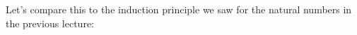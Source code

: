 \documentclass{lecturenotes}
\begin{document}
\begin{center}
    \begin{code}%
%
\>[8]\AgdaSpace{}%
\AgdaSymbol{:}\AgdaSpace{}%
\AgdaSpace{}%
\AgdaSymbol{(}\AgdaSpace{}%
\AgdaSymbol{:}\AgdaSpace{}%
\AgdaSpace{}%
\AgdaSymbol{->}\AgdaSpace{}%
\AgdaSymbol{)}\AgdaSpace{}%
\AgdaSymbol{->}\AgdaSpace{}%
\AgdaSpace{}%
\AgdaSpace{}%
\AgdaSymbol{->}\AgdaSpace{}%
\AgdaSpace{}%
\AgdaSpace{}%
\AgdaSymbol{->}\AgdaSpace{}%
\AgdaSpace{}%
\AgdaSymbol{(}\AgdaSpace{}%
\AgdaSymbol{:}\AgdaSpace{}%
\AgdaSymbol{)}\AgdaSpace{}%
\AgdaSymbol{->}\AgdaSpace{}%
\AgdaSymbol{(}\AgdaSymbol{)}\<%
\\
%
\>[8]\AgdaSpace{}%
\AgdaSpace{}%
\AgdaSpace{}%
\AgdaSpace{}%
\AgdaSpace{}%
\AgdaSymbol{=}\AgdaSpace{}%
\<%
\\
%
\>[8]\AgdaSpace{}%
\AgdaSpace{}%
\AgdaSpace{}%
\AgdaSpace{}%
\AgdaSpace{}%
\AgdaSymbol{=}\AgdaSpace{}%
\<%
\end{code}
\end{center}

\vspace{0.2in}

\noindent Let's compare this to the induction principle we saw for the natural numbers in the previous lecture: 
\end{document}
